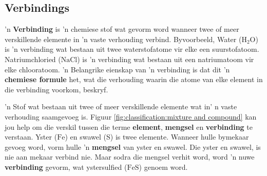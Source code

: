             \subsection*{Verbindings}
            \nopagebreak
        \label{m38708*id63363} 'n \textbf{Verbinding} is 'n chemiese stof wat gevorm word wanneer twee of meer verskillende elemente in 'n vaste verhouding verbind. Byvoorbeeld, Water ($\text{H}{}_{2}\text{O}$) is 'n verbinding wat bestaan uit twee waterstofatome vir elke een suurstofatoom. Natriumchloried ($\text{NaCl}$) is 'n verbinding wat bestaan uit een natriumatoom vir elke chlooratoom. 'n Belangrike eienskap van 'n verbinding is dat dit 'n \textbf{chemiese formule} het, wat die verhouding waarin die atome van elke element in die verbinding voorkom, beskryf.\par 
\label{m38708*fhsst!!!underscore!!!id201}
 { \label{m38708*meaningfhsst!!!underscore!!!id201}
        'n Stof wat bestaan uit twee of meer verskillende elemente wat in' n vaste verhouding saamgevoeg is.
         } 
        \label{m38708*id63410} Figuur \ref{fig:classification:mixture and compound} kan jou help om die verskil tussen die terme \textbf{element}, \textbf{mengsel} en \textbf{verbinding} te verstaan. Yster ($\text{Fe}$) en swawel ($\text{S}$) is twee elemente. Wanneer hulle bymekaar gevoeg word, vorm hulle 'n \textbf{mengsel} van yster en swawel. Die yster en swawel, is nie aan mekaar verbind nie. Maar sodra die mengsel verhit word, word 'n nuwe \textbf{verbinding} gevorm, wat ystersulfied ($\text{FeS}$) genoem word.\par 
